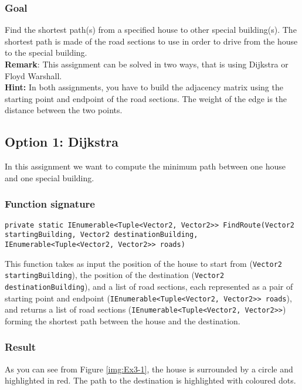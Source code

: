 \subsubsection*{Goal}
Find the shortest path(s) from a specified house to other special building(s). The shortest path is made of the road sections to use in order to drive from the house to the special building.\\
\textbf{Remark}: This assignment can be solved in two ways, that is using Dijkstra or Floyd Warshall.\\
\textbf{Hint:} In both assignments, you have to build the adjacency matrix using the starting point and endpoint of the road sections. The weight of the edge is the distance between the two points.

\subsection*{Option 1: Dijkstra}
In this assignment we want to compute the minimum path between one house and one special building. 

\subsubsection*{Function signature} 
\begin{lstlisting}
private static IEnumerable<Tuple<Vector2, Vector2>> FindRoute(Vector2 startingBuilding, Vector2 destinationBuilding, IEnumerable<Tuple<Vector2, Vector2>> roads)
\end{lstlisting}

\noindent
This function takes as input the position of the house to start from (\texttt{Vector2 startingBuilding}), the position of the destination (\texttt{Vector2 destinationBuilding}), and a list of road sections, each represented as a pair of starting point and endpoint (\texttt{IEnumerable<Tuple<Vector2, Vector2>> roads}), and returns a list of road sections (\texttt{IEnumerable<Tuple<Vector2, Vector2>>}) forming the shortest path between the house and the destination.\\

\subsubsection*{Result} 
As you can see from Figure \ref{img:Ex3-1}, the house is surrounded by a circle and highlighted in red. The path to the destination is highlighted with coloured dots.

